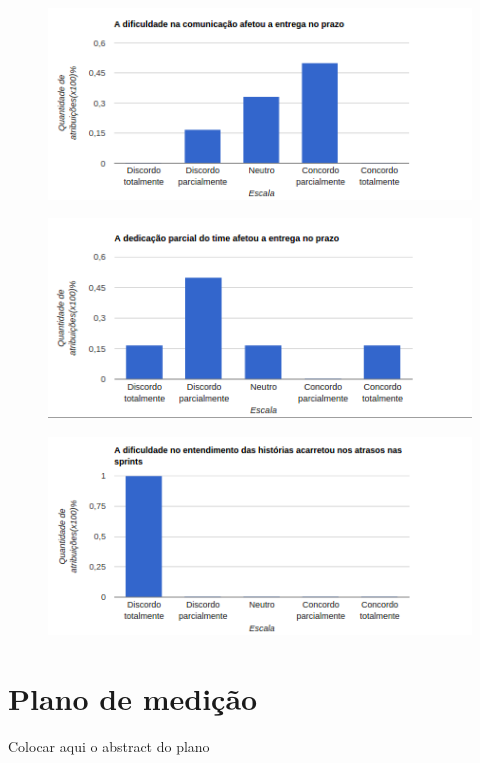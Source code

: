 \begin{apendicesenv}
  			\begin{figure}[!htb]
  			\center
  			\includegraphics[scale=0.9]{figuras/grafico_6.png}
  			\end{figure}
 
  			\begin{figure}[!htb]
  			\center
  			\includegraphics[scale=0.9]{figuras/grafico_7.png}
  			\end{figure}
 
  			\begin{figure}[!htb]
  			\center
  			\includegraphics[scale=0.9]{figuras/grafico_8.png}
  			\end{figure}

  \chapter{Plano de medição}

     Colocar aqui o abstract do plano


\end{apendicesenv}

